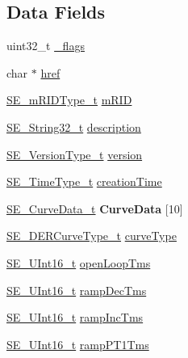 \subsection*{Data Fields}
\begin{DoxyCompactItemize}
\item 
uint32\+\_\+t \hyperlink{group__DERCurve_gaed4a71593a5f29f29c53fda240e616e4}{\+\_\+flags}
\item 
char $\ast$ \hyperlink{group__DERCurve_gae8312bc271b89dbee978056bd65b12bf}{href}
\item 
\hyperlink{group__mRIDType_gac74622112f3a388a2851b2289963ba5e}{S\+E\+\_\+m\+R\+I\+D\+Type\+\_\+t} \hyperlink{group__DERCurve_gae779658d736d0fcca90bbe1f932ed0b8}{m\+R\+ID}
\item 
\hyperlink{group__String32_gac9f59b06b168b4d2e0d45ed41699af42}{S\+E\+\_\+\+String32\+\_\+t} \hyperlink{group__DERCurve_ga895686dd6b59302a6afd6695d01db9d9}{description}
\item 
\hyperlink{group__VersionType_ga4b8d27838226948397ed99f67d46e2ae}{S\+E\+\_\+\+Version\+Type\+\_\+t} \hyperlink{group__DERCurve_gaa0cda98a583e9f6fa1ec89ce6091c496}{version}
\item 
\hyperlink{group__TimeType_ga6fba87a5b57829b4ff3f0e7638156682}{S\+E\+\_\+\+Time\+Type\+\_\+t} \hyperlink{group__DERCurve_gaa955e114839f61826bb2fb4adabb5923}{creation\+Time}
\item 
\hyperlink{structSE__CurveData__t}{S\+E\+\_\+\+Curve\+Data\+\_\+t} {\bfseries Curve\+Data} \mbox{[}10\mbox{]}
\item 
\hyperlink{group__DERCurveType_gad16d5a3d1a31b3f09dc59e04101c0d8e}{S\+E\+\_\+\+D\+E\+R\+Curve\+Type\+\_\+t} \hyperlink{group__DERCurve_ga076f4efebdfbd4e6e2070fb9d8db7f4a}{curve\+Type}
\item 
\hyperlink{group__UInt16_gac68d541f189538bfd30cfaa712d20d29}{S\+E\+\_\+\+U\+Int16\+\_\+t} \hyperlink{group__DERCurve_gabd187c05086b853051ae25393be08ef8}{open\+Loop\+Tms}
\item 
\hyperlink{group__UInt16_gac68d541f189538bfd30cfaa712d20d29}{S\+E\+\_\+\+U\+Int16\+\_\+t} \hyperlink{group__DERCurve_ga727ca3765e8a6f57f39c618c73e3db25}{ramp\+Dec\+Tms}
\item 
\hyperlink{group__UInt16_gac68d541f189538bfd30cfaa712d20d29}{S\+E\+\_\+\+U\+Int16\+\_\+t} \hyperlink{group__DERCurve_ga93d46bb90365c6520360905b72b53cd8}{ramp\+Inc\+Tms}
\item 
\hyperlink{group__UInt16_gac68d541f189538bfd30cfaa712d20d29}{S\+E\+\_\+\+U\+Int16\+\_\+t} \hyperlink{group__DERCurve_gac3e2d656269ffc0cb1ba8e642f6893b4}{ramp\+P\+T1\+Tms}

\end{DoxyCompactItemize}
